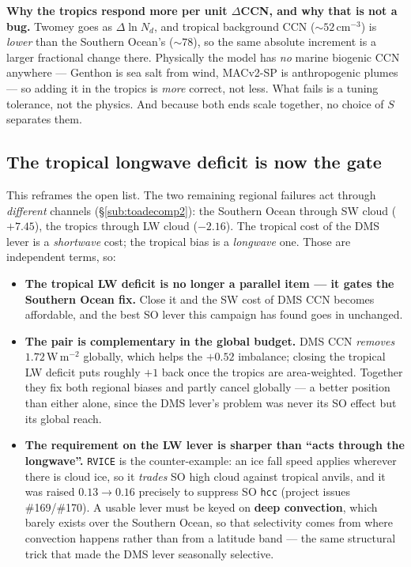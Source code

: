 \documentclass[10pt]{article}
\begin{document}
\textbf{Why the tropics respond more per unit $\Delta$CCN, and why that is not a bug.}
Twomey goes as $\Delta\ln N_d$, and tropical background CCN ($\sim52$\,cm$^{-3}$) is
\emph{lower} than the Southern Ocean's ($\sim78$), so the same absolute increment is a larger
fractional change there. Physically the model has \emph{no} marine biogenic CCN anywhere ---
Genthon is sea salt from wind, MACv2-SP is anthropogenic plumes --- so adding it in the
tropics is \emph{more} correct, not less. What fails is a tuning tolerance, not the physics.
And because both ends scale together, no choice of $S$ separates them.

\subsection{The tropical longwave deficit is now the gate}\label{sub:r26gate}
This reframes the open list. The two remaining regional failures act through
\emph{different} channels (\S\ref{sub:toadecomp2}): the Southern Ocean through SW cloud
($+7.45$), the tropics through LW cloud ($-2.16$). The tropical cost of the DMS lever is a
\emph{shortwave} cost; the tropical bias is a \emph{longwave} one. Those are independent
terms, so:

\begin{itemize}\itemsep2pt
\item \textbf{The tropical LW deficit is no longer a parallel item --- it gates the Southern
Ocean fix.} Close it and the SW cost of DMS CCN becomes affordable, and the best SO lever
this campaign has found goes in unchanged.
\item \textbf{The pair is complementary in the global budget.} DMS CCN \emph{removes}
$1.72$\,W\,m$^{-2}$ globally, which helps the $+0.52$ imbalance; closing the tropical LW
deficit puts roughly $+1$ back once the tropics are area-weighted. Together they fix both
regional biases and partly cancel globally --- a better position than either alone, since
the DMS lever's problem was never its SO effect but its global reach.
\item \textbf{The requirement on the LW lever is sharper than ``acts through the
longwave''.} \texttt{RVICE} is the counter-example: an ice fall speed applies wherever there
is cloud ice, so it \emph{trades} SO high cloud against tropical anvils, and it was raised
$0.13\to0.16$ precisely to suppress SO \texttt{hcc} (project issues \#169/\#170). A usable
lever must be keyed on \textbf{deep convection}, which barely exists over the Southern
Ocean, so that selectivity comes from where convection happens rather than from a latitude
band --- the same structural trick that made the DMS lever seasonally selective.
\end{itemize}
\end{document}
